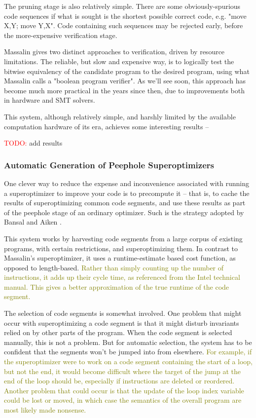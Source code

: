 \documentclass[12pt,twoside]{reedthesis}
\newcommand{\red}[1]{\textcolor{red}{#1}}
\newcommand{\green}[1]{\textcolor{olive}{#1}}
\newcommand{\addressed}[2]{{#1}}
\begin{document}
The pruning stage is also relatively simple.
There are some obviously-spurious code sequences if what is sought is the shortest possible correct code, e.g. "move X,Y; move Y,X".
Code containing such sequences may be rejected early, before the more-expensive verification stage.
    
Massalin gives two distinct approaches to verification, driven by resource limitations.
The reliable, but slow and expensive way, is to logically test the bitwise equivalency of the candidate program to the desired program, using what Massalin calls a "boolean program verifier".
As we'll see soon, this approach has become much more practical in the years since then, due to improvements both in hardware and SMT solvers. 
    
This system, although relatively simple, and harshly limited by the available computation hardware of its era, achieves some interesting results --
    
\red{TODO:} add results %

\subsubsection{Automatic Generation of Peephole Superoptimizers}
One clever way to reduce the expense and inconvenience associated with running a superoptimizer to improve your code is to precompute it
-- that is, to cache the results of superoptimizing common code segments, and use these results as part of the peephole stage of an ordinary optimizer.
Such is the strategy adopted by Bansal and Aiken \cite{bansal2006peephole}.
    
This system works by harvesting code segments from a large corpus of existing programs, with certain restrictions, and superoptimizing them. 
In contrast to Massalin's superoptimizer, it uses a \addressed{runtime-estimate based cost function}{elaborate on this},
as opposed to length-based.
\green{
Rather than simply counting up the number of instructions, it adds up their cycle time, as referenced from the Intel technical manual.
This gives a better approximation of the true runtime of the code segment.
}
    
The selection of code segments is somewhat involved.
One problem that might occur with superoptimizing a code segment is that it might
\addressed{disturb invariants relied on by other parts of the program}{a small example of this would help clarify}.
When the code segment is selected manually, this is not a problem.
But for automatic selection, the system has to be confident that the segments won't be
\addressed{jumped into from elsewhere}{this could also use an example or more explanation}. 
\green{
For example, if the superoptimizer were to work on a code segment containing the start of a loop, but not the end, it would become difficult where the target of the jump at the end of the loop should be, especially if instructions are deleted or reordered.
Another problem that could occur is that the update of the loop index variable could be lost or moved, in which case the semantics of the overall program are most likely made nonsense.
}
    
\end{document}
